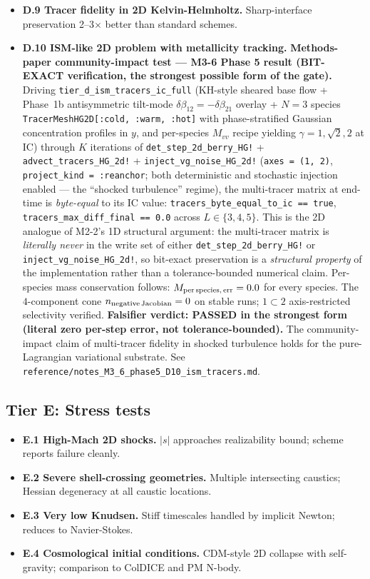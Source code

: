\documentclass[11pt]{article}
\begin{document}
\begin{itemize}
\item \textbf{D.9 Tracer fidelity in 2D Kelvin-Helmholtz.} Sharp-interface
preservation 2--3$\times$ better than standard schemes.
\item \textbf{D.10 ISM-like 2D problem with metallicity tracking.}
\textbf{Methods-paper community-impact test ---
M3-6 Phase 5 result (BIT-EXACT verification, the strongest possible
form of the gate).} Driving \texttt{tier\_d\_ism\_tracers\_ic\_full}
(KH-style sheared base flow + Phase~1b antisymmetric tilt-mode
$\delta\beta_{12} = -\delta\beta_{21}$ overlay + $N = 3$ species
\texttt{TracerMeshHG2D[:cold,\,:warm,\,:hot]} with phase-stratified
Gaussian concentration profiles in $y$, and per-species $M_{vv}$
recipe yielding $\gamma = 1, \sqrt{2}, 2$ at IC) through $K$
iterations of \texttt{det\_step\_2d\_berry\_HG!} +
\texttt{advect\_tracers\_HG\_2d!} +
\texttt{inject\_vg\_noise\_HG\_2d!}
(\texttt{axes = (1, 2)}, \texttt{project\_kind = :reanchor}; both
deterministic and stochastic injection enabled --- the ``shocked
turbulence'' regime), the multi-tracer matrix at end-time is
\emph{byte-equal} to its IC value:
\texttt{tracers\_byte\_equal\_to\_ic == true},
\texttt{tracers\_max\_diff\_final == 0.0} across $L \in \{3, 4, 5\}$.
This is the 2D analogue of M2-2's 1D structural argument: the
multi-tracer matrix is \emph{literally never} in the write set of
either \texttt{det\_step\_2d\_berry\_HG!} or
\texttt{inject\_vg\_noise\_HG\_2d!}, so bit-exact preservation is a
\emph{structural property} of the implementation rather than a
tolerance-bounded numerical claim. Per-species mass conservation
follows: $M_{\rm per\,species,\,err} = 0.0$ for every species. The
$4$-component cone $n_{\rm negative\,Jacobian} = 0$ on stable runs;
$1\!\subset\!2$ axis-restricted selectivity verified.
\textbf{Falsifier verdict: PASSED in the strongest form (literal zero
per-step error, not tolerance-bounded).} The community-impact claim
of multi-tracer fidelity in shocked turbulence holds for the
pure-Lagrangian variational substrate. See
\verb|reference/notes_M3_6_phase5_D10_ism_tracers.md|.
\end{itemize}

\subsection{Tier E: Stress tests}
\label{sec:tier-E}

\begin{itemize}
\item \textbf{E.1 High-Mach 2D shocks.} $|s|$ approaches realizability
bound; scheme reports failure cleanly.
\item \textbf{E.2 Severe shell-crossing geometries.} Multiple
intersecting caustics; Hessian degeneracy at all caustic locations.
\item \textbf{E.3 Very low Knudsen.} Stiff timescales handled by
implicit Newton; reduces to Navier-Stokes.
\item \textbf{E.4 Cosmological initial conditions.} CDM-style 2D
collapse with self-gravity; comparison to ColDICE and PM N-body.
\end{itemize}
\end{document}
